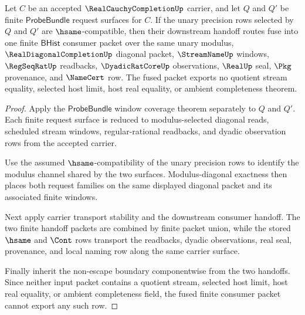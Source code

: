 \begin{theorem}
\label{thm:real-cauchy-completion-finite-request-fusion}
Let $C$ be an accepted $\RealCauchyCompletionUp$ carrier, and let $Q$ and $Q'$ be finite $\mathsf{ProbeBundle}$ request surfaces for $C$. If the unary precision rows selected by $Q$ and $Q'$ are $\hsame$-compatible, then their downstream handoff routes fuse into one finite $\mathsf{BHist}$ consumer packet over the same unary modulus, $\RealDiagonalCompletionUp$ diagonal packet, $\StreamNameUp$ windows, $\RegSeqRatUp$ readbacks, $\DyadicRatCoreUp$ observations, $\RealUp$ seal, $\Pkg$ provenance, and $\NameCert$ row. The fused packet exports no quotient stream equality, selected host limit, host real equality, or ambient completeness theorem.
\end{theorem}
\begin{proof}
Apply the $\mathsf{ProbeBundle}$ window coverage theorem separately to $Q$ and $Q'$. Each finite request surface is reduced to modulus-selected diagonal reads, scheduled stream windows, regular-rational readbacks, and dyadic observation rows from the accepted carrier.

Use the assumed $\hsame$-compatibility of the unary precision rows to identify the modulus channel shared by the two surfaces. Modulus-diagonal exactness then places both request families on the same displayed diagonal packet and its associated finite windows.

Next apply carrier transport stability and the downstream consumer handoff. The two finite handoff packets are combined by finite packet union, while the stored $\hsame$ and $\Cont$ rows transport the readbacks, dyadic observations, real seal, provenance, and local naming row along the same carrier surface.

Finally inherit the non-escape boundary componentwise from the two handoffs. Since neither input packet contains a quotient stream, selected host limit, host real equality, or ambient completeness field, the fused finite consumer packet cannot export any such row.
\end{proof}

